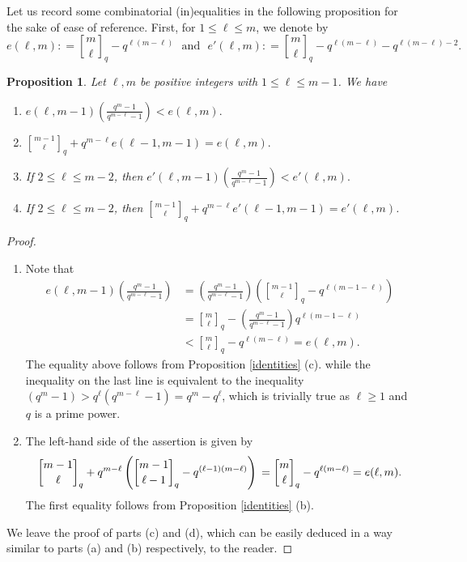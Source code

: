 \documentclass[10pt,a4paper,oneside]{amsproc}
\newtheorem{proposition}[theorem]{Proposition}
\begin{document}
Let us record some combinatorial (in)equalities in the following proposition for the sake of ease of reference. First, for $1 \le \ell \le m$, we denote by
$$e (\ell, m): = {m \brack \ell}_q - q^{\ell (m - \ell)} \ \ \ \text{and} \ \ \ e' (\ell, m): = {m \brack \ell}_q - q^{\ell (m - \ell)} - q^{\ell (m - \ell) - 2}.$$

\begin{proposition}\label{ineq}
    Let $\ell, m$ be positive integers with $1 \le \ell \le m-1$. We have 
    \begin{enumerate}
        \item[(a)] $e (\ell, m-1) \left(\frac{q^m -1}{q^{m-\ell} - 1}\right) < e (\ell, m).$
        \item[(b)] ${m - 1 \brack \ell}_q + q^{m-\ell} e (\ell -1, m-1) = e (\ell, m). $
        \item[(c)] If $2 \le \ell \le m-2$, then $e' (\ell, m-1) \left(\frac{q^m -1}{q^{m-\ell} - 1}\right) < e' (\ell, m).$
        \item[(d)] If $2 \le \ell \le m-2$, then ${m - 1 \brack \ell}_q + q^{m-\ell} e' (\ell -1, m-1) = e' (\ell, m)$.
    \end{enumerate}
\end{proposition}

\begin{proof}
    \
    \begin{enumerate}
        \item[(a)] Note that \begin{align*}
        e (\ell, m-1) \left(\frac{q^m -1}{q^{m-\ell} - 1}\right) &=\left(\frac{q^m - 1}{q^{m-\ell} - 1} \right) \left( {m - 1 \brack \ell}_q - q^{\ell(m-1 - \ell)} \right) \\
        &= {m \brack \ell}_q - \left(\frac{q^m - 1}{q^{m-\ell} - 1}\right) q^{\ell(m-1 - \ell)} \\
        &< {m \brack \ell}_q - q^{\ell (m-\ell)} = e(\ell, m).
    \end{align*}
    The equality above follows from Proposition \ref{identities} (c). 
    while the inequality on the last line is equivalent to the inequality $(q^m - 1) > q^\ell (q^{m - \ell} - 1) = q^m - q^\ell$, which is trivially true as $\ell \ge 1$ and $q$ is a prime power. 
    \item[(b)] The left-hand side of the assertion is given by
        \begin{equation*}
        {m - 1 \brack \ell}_q + q^{m - \ell} \left({ m - 1 \brack \ell - 1}_q - q^{(\ell-1)(m - \ell)} \right) \\
       =  {m \brack \ell}_q - q^{\ell(m- \ell)} = e(\ell, m). 
    \end{equation*} 
    The first equality follows from  Proposition \ref{identities} (b). 
    \end{enumerate}
    We leave the proof of parts (c) and (d), which can be easily deduced in a way similar to parts (a) and (b) respectively, to the reader. 
\end{proof}
\end{document}
